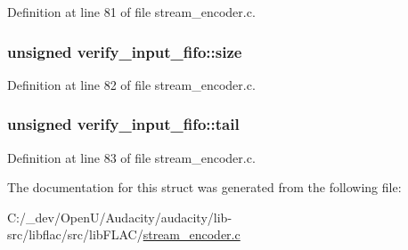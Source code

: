 Definition at line 81 of file stream\+\_\+encoder.\+c.

\subsubsection[{\texorpdfstring{size}{size}}]{\setlength{\rightskip}{0pt plus 5cm}unsigned verify\+\_\+input\+\_\+fifo\+::size}\hypertarget{structverify__input__fifo_ab9396a19f516f769a6f73b45941cd037}{}\label{structverify__input__fifo_ab9396a19f516f769a6f73b45941cd037}


Definition at line 82 of file stream\+\_\+encoder.\+c.

\subsubsection[{\texorpdfstring{tail}{tail}}]{\setlength{\rightskip}{0pt plus 5cm}unsigned verify\+\_\+input\+\_\+fifo\+::tail}\hypertarget{structverify__input__fifo_af861deb13a34f9a89e96f5c6d806eff3}{}\label{structverify__input__fifo_af861deb13a34f9a89e96f5c6d806eff3}


Definition at line 83 of file stream\+\_\+encoder.\+c.



The documentation for this struct was generated from the following file\+:\begin{DoxyCompactItemize}
\item 
C\+:/\+\_\+dev/\+Open\+U/\+Audacity/audacity/lib-\/src/libflac/src/lib\+F\+L\+A\+C/\hyperlink{stream__encoder_8c}{stream\+\_\+encoder.\+c}\end{DoxyCompactItemize}
